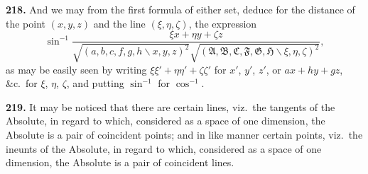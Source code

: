 \documentclass[11pt,a4paper]{book}
\begin{document}
\begin{center}
\textbf{218.} And we may from the first formula of either set, deduce for the distance
of the point $(x,y,z)$ and the line $(\xi,\eta,\zeta)$, the expression
\[
\sin^{-1}\frac{\xi x+\eta y+\zeta z}{\sqrt{(a,b,c,f,g,h\!\backslash x,y,z)^2}\sqrt{(\mathfrak{A},\mathfrak{B},\mathfrak{C},\mathfrak{F},\mathfrak{G},\mathfrak{H}\!\backslash \xi,\eta,\zeta)^2}},
\]
as may be easily seen by writing $\xi\xi'+\eta\eta'+\zeta\zeta'$ for $x'$, $y'$, $z'$, or $ax+hy+gz$, \&c.\ for
$\xi$, $\eta$, $\zeta$, and putting $\sin^{-1}$ for $\cos^{-1}$.

\textbf{219.} It may be noticed that there are certain lines, viz.\ the tangents of the
Absolute, in regard to which, considered as a space of one dimension, the Absolute is
a pair of coincident points; and in like manner certain points, viz.\ the ineunts of the
Absolute, in regard to which, considered as a space of one dimension, the Absolute is
a pair of coincident lines.


\end{center}
\end{document}
